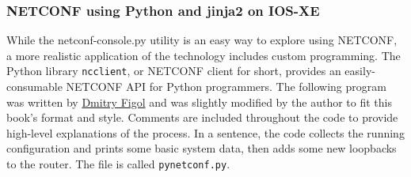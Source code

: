 \subsubsection{NETCONF using Python and jinja2 on IOS-XE}
While the netconf-console.py utility is an easy way to explore using NETCONF,
a more realistic application of the technology includes custom programming.
The Python library \verb|ncclient|, or NETCONF client for short, provides an
easily-consumable NETCONF API for Python programmers. The following program
was written by \href{https://twitter.com/dmfigol}{Dmitry Figol} and was
slightly modified by the author to fit this book's format and style. Comments
are included throughout the code to provide high-level explanations of the
process. In a sentence, the code collects the running configuration and prints
some basic system data, then adds some new loopbacks to the router. The file
is called \verb|pynetconf.py|.

